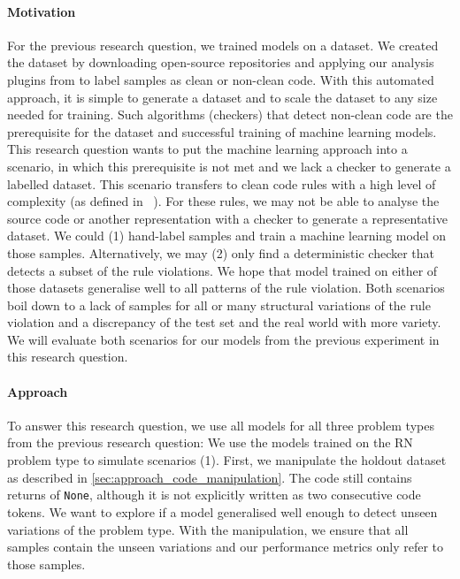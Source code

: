 \paragraph{Motivation}
For the previous research question, we trained models on a dataset. We created the dataset by downloading open-source repositories and applying our analysis plugins from  to label samples as clean or non-clean code. With this automated approach, it is simple to generate a dataset and to scale the dataset to any size needed for training. Such algorithms (checkers) that detect non-clean code are the prerequisite for the dataset and successful training of machine learning models. This research question wants to put the machine learning approach into a scenario, in which this prerequisite is not met and we lack a checker to generate a labelled dataset. 
This scenario transfers to clean code rules with a high level of complexity (as defined in ~). For these rules, we may not be able to analyse the source code or another representation with a checker to generate a representative dataset. We could (1) hand-label samples and train a machine learning model on those samples. Alternatively, we may (2) only find a deterministic checker that detects a subset of the rule violations. We hope that model trained on either of those datasets generalise well to all patterns of the rule violation. Both scenarios boil down to a lack of samples for all or many structural variations of the rule violation and a discrepancy of the test set and the real world with more variety. We will evaluate both scenarios for our models from the previous experiment in this research question.


\paragraph{Approach}
To answer this research question, we use all models for all three problem types from the previous research question: 
We use the models trained on the RN problem type to simulate scenarios (1). First, we manipulate the holdout dataset as described in \ref{sec:approach_code_manipulation}. The code still contains returns of \texttt{None}, although it is not explicitly written as two consecutive code tokens. We want to explore if a model generalised well enough to detect unseen variations of the problem type. With the manipulation, we ensure that all samples contain the unseen variations and our performance metrics only refer to those samples. 

